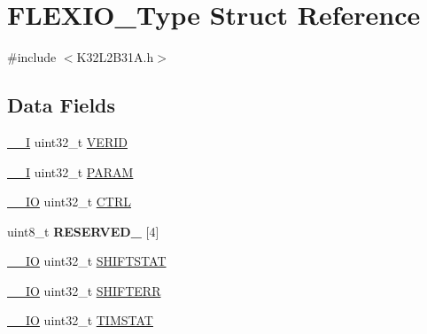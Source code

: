 \hypertarget{struct_f_l_e_x_i_o___type}{}\section{F\+L\+E\+X\+I\+O\+\_\+\+Type Struct Reference}
\label{struct_f_l_e_x_i_o___type}


{\ttfamily \#include $<$K32\+L2\+B31\+A.\+h$>$}

\subsection*{Data Fields}
\begin{DoxyCompactItemize}
\item 
\mbox{\hyperlink{core__cm0plus_8h_af63697ed9952cc71e1225efe205f6cd3}{\+\_\+\+\_\+I}} uint32\+\_\+t \mbox{\hyperlink{struct_f_l_e_x_i_o___type_ab20ff3f0387cbcc2652477ed5d2702df}{V\+E\+R\+ID}}
\item 
\mbox{\hyperlink{core__cm0plus_8h_af63697ed9952cc71e1225efe205f6cd3}{\+\_\+\+\_\+I}} uint32\+\_\+t \mbox{\hyperlink{struct_f_l_e_x_i_o___type_a96563b10e1e91f05203f88047408044a}{P\+A\+R\+AM}}
\item 
\mbox{\hyperlink{core__cm0plus_8h_aec43007d9998a0a0e01faede4133d6be}{\+\_\+\+\_\+\+IO}} uint32\+\_\+t \mbox{\hyperlink{struct_f_l_e_x_i_o___type_a15fc8d35f045f329b80c544bef35ff64}{C\+T\+RL}}
\item 
\mbox{\label{struct_f_l_e_x_i_o___type_a71277aaa40be4473ac2521981f273bd3}} 
uint8\+\_\+t {\bfseries R\+E\+S\+E\+R\+V\+E\+D\+\_} \mbox{[}4\mbox{]}
\item 
\mbox{\hyperlink{core__cm0plus_8h_aec43007d9998a0a0e01faede4133d6be}{\+\_\+\+\_\+\+IO}} uint32\+\_\+t \mbox{\hyperlink{struct_f_l_e_x_i_o___type_a3d40c2ada5f832e7800b30feeaf8a8db}{S\+H\+I\+F\+T\+S\+T\+AT}}
\item 
\mbox{\hyperlink{core__cm0plus_8h_aec43007d9998a0a0e01faede4133d6be}{\+\_\+\+\_\+\+IO}} uint32\+\_\+t \mbox{\hyperlink{struct_f_l_e_x_i_o___type_ad347c3a79fc856a6b4a44a448f9e3a0c}{S\+H\+I\+F\+T\+E\+RR}}
\item 
\mbox{\hyperlink{core__cm0plus_8h_aec43007d9998a0a0e01faede4133d6be}{\+\_\+\+\_\+\+IO}} uint32\+\_\+t \mbox{\hyperlink{struct_f_l_e_x_i_o___type_ae6ff4ad124af251e253d7c736c688675}{T\+I\+M\+S\+T\+AT}}
\item 
\mbox{\label{struct_f_l_e_x_i_o___type_a422ac2beba1cc5c797380d1c5832b885}} 

\end{DoxyCompactItemize}
